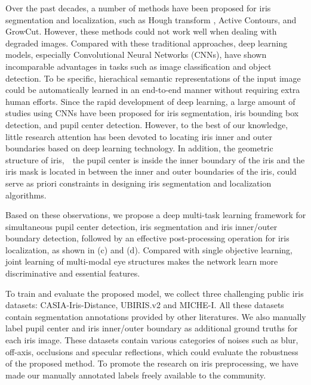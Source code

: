 \documentclass[journal]{IEEEtran}
\begin{document}
Over the past decades, a number of methods have been proposed for iris segmentation and localization, such as Hough transform \cite{wildes1997iris,Zhao2015An}, Active Contours\cite{Banerjee2016}, and GrowCut\cite{RADMAN201760}.
However, these methods could not work well when dealing with degraded images.
Compared with these traditional approaches, deep learning models, especially Convolutional Neural Networks (CNNs), have shown incomparable advantages in tasks such as image classification\cite{krizhevsky2012imagenet} and object detection\cite{ren2015faster}.
To be specific, hierachical semantic representations of the input image could be automatically learned in an end-to-end manner without requiring extra human efforts.
Since the rapid development of deep learning, a large amount of studies using CNNs have been proposed for iris segmentation\cite{liu2016accurate,Jalilian2017Domain,Bazrafkan2018An,severo2018benchmark,arsalan2018irisdensenet}, iris bounding box detection\cite{severo2018benchmark}, and pupil center detection\cite{chinsatit2017cnn,veraolmos2017deconvolutional,park2018learning}.
However, to the best of our knowledge, little research attention has been devoted to locating iris inner and outer boundaries based on deep learning technology. In addition, the geometric structure of iris,~\ie~the pupil center is inside the inner boundary of the iris and the iris mask is located in between the inner and outer boundaries of the iris, could serve as priori constraints in designing iris segmentation and localization algorithms.

Based on these observations, we propose a deep multi-task learning framework for simultaneous pupil center detection, iris segmentation and iris inner/outer boundary detection, followed by an effective post-processing operation for iris localization, as shown in  (c) and (d).
Compared with single objective learning, joint learning of multi-modal eye structures makes the network learn more discriminative and essential features.

To train and evaluate the proposed model, we collect three challenging public iris datasets: CASIA-Iris-Distance\cite{casiav4}, UBIRIS.v2\cite{UBIRISv2} and MICHE-I\cite{miche_dataset}. All these datasets contain segmentation annotations provided by other literatures.
We also manually label pupil center and iris inner/outer boundary as additional ground truths for each iris image. These datasets contain various categories of noises such as blur, off-axis, occlusions and specular reflections, which could evaluate the robustness of the proposed method.
To promote the research on iris preprocessing, we have made our manually annotated labels freely available to the community.
\end{document}
